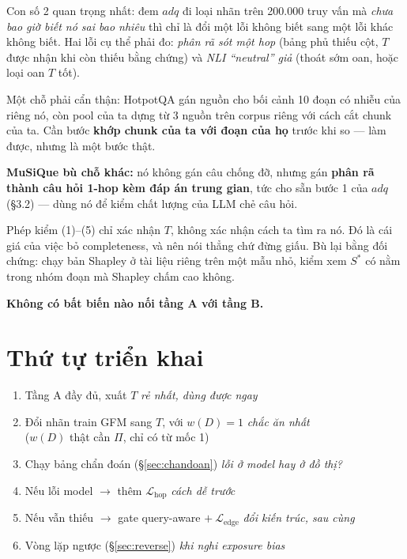 \documentclass[11pt,a4paper]{article}
\begin{document}
Con số 2 quan trọng nhất: đem $adq$ đi loại nhãn trên 200.000 truy vấn mà \emph{chưa bao giờ
biết nó sai bao nhiêu} thì chỉ là đổi một lỗi không biết sang một lỗi khác không biết. Hai lỗi
cụ thể phải đo: \emph{phân rã sót một hop} (bảng phủ thiếu cột, $T$ được nhận khi còn thiếu
bằng chứng) và \emph{NLI ``neutral'' giả} (thoát sớm oan, hoặc loại oan $T$ tốt).

Một chỗ phải cẩn thận: HotpotQA gán nguồn cho bối cảnh 10 đoạn có nhiễu của riêng nó, còn pool
của ta dựng từ 3 nguồn trên corpus riêng với cách cắt chunk của ta. Cần bước \textbf{khớp chunk
của ta với đoạn của họ} trước khi so --- làm được, nhưng là một bước thật.

\textbf{MuSiQue bù chỗ khác:} nó không gán câu chống đỡ, nhưng gán \textbf{phân rã thành câu
hỏi 1-hop kèm đáp án trung gian}, tức cho sẵn bước 1 của $adq$ (\S3.2) --- dùng nó để kiểm
chất lượng của LLM chẻ câu hỏi.

Phép kiểm (1)--(5) chỉ xác nhận $T$, không xác nhận cách ta tìm ra nó. Đó là cái giá của
việc bỏ completeness, và nên nói thẳng chứ đừng giấu. Bù lại bằng đối chứng: chạy bản
Shapley ở tài liệu riêng trên một mẫu nhỏ, kiểm xem $S^*$ có nằm trong nhóm đoạn mà Shapley
chấm cao không.

\textbf{Không có bất biến nào nối tầng A với tầng B.}

\section{Thứ tự triển khai}

\begin{enumerate}[leftmargin=2.2em]
\item Tầng A đầy đủ, xuất $T$ \hfill \emph{rẻ nhất, dùng được ngay}
\item Đổi nhãn train GFM sang $T$, với $w(D)=1$ \hfill \emph{chắc ăn nhất}
      \\[-2pt]{\footnotesize\hspace*{1em}($w(D)$ thật cần $\Pi$, chỉ có từ mốc 1)}
\item Chạy bảng chẩn đoán (\S\ref{sec:chandoan}) \hfill \emph{lỗi ở model hay ở đồ thị?}
\item Nếu lỗi model $\to$ thêm $\mathcal{L}_{\text{hop}}$ \hfill \emph{cách dễ trước}
\item Nếu vẫn thiếu $\to$ gate query-aware $+\ \mathcal{L}_{\text{edge}}$ \hfill \emph{đổi kiến trúc, sau cùng}
\item Vòng lặp ngược (\S\ref{sec:reverse}) \hfill \emph{khi nghi exposure bias}
\end{enumerate}
\end{document}
